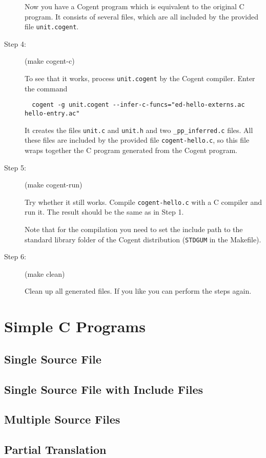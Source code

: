 \documentclass[a4paper]{report}
\newcommand{\code}[1]{\textnormal{\texttt{#1}}}
\begin{document}
\begin{description}
Now you have a Cogent program which is equivalent to the original C program. It consists of several files,
which are all included by the provided file \code{unit.cogent}.

\item[Step 4:] (make cogent-c)

To see that it works, process \code{unit.cogent} by the Cogent compiler. Enter the command
\begin{verbatim}
  cogent -g unit.cogent --infer-c-funcs="ed-hello-externs.ac hello-entry.ac"
\end{verbatim}
It creates the files \code{unit.c} and \code{unit.h} and two \code{\_pp\_inferred.c} files. All these files
are included by the provided file \code{cogent-hello.c}, so this file wraps together the C program generated
from the Cogent program.

\item[Step 5:] (make cogent-run)

Try whether it still works. Compile \code{cogent-hello.c} with a C compiler and run it. The result should be the same
as in Step 1.

Note that for the compilation you need to set the include path to the standard library folder of the Cogent 
distribution (\code{STDGUM} in the Makefile).

\item[Step 6:] (make clean)

Clean up all generated files. If you like you can perform the steps again.
\end{description}

\chapter{Simple C Programs}

\section{Single Source File}
\label{simple-single}

\section{Single Source File with Include Files}
\label{simple-include}

\section{Multiple Source Files}
\label{simple-multi}

\section{Partial Translation}
\label{simple-partial}
\end{document}
